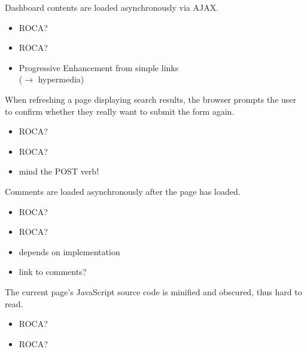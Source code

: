 \documentclass{beamer}
\newcommand{\rocaok}{\ding{51}}
\newcommand{\rocafail}{\ding{55}}
\begin{document}
\begin{frame}
  Dashboard contents are loaded asynchronously via AJAX.

  \vspace{0.3cm}
  \begin{itemize}
    \item<1|only@1>[\Large $\square$] \Large ROCA?
    \item<2|only@2>[\Large \rocaok] \Large ROCA?
    \item<2> Progressive Enhancement from simple links \\ (\ensuremath{\rightarrow} hypermedia)
  \end{itemize}

\end{frame}

\begin{frame}
  When refreshing a page displaying search results, the browser prompts the
  user to confirm whether they really want to submit the form again.

  \vspace{0.3cm}
  \begin{itemize}
    \item<1|only@1>[\Large $\square$] \Large ROCA?
    \item<2|only@2>[\Large \rocafail] \Large ROCA?
    \item<2> mind the POST verb!
  \end{itemize}

\end{frame}

\begin{frame}
  Comments are loaded asynchronously after the page has loaded.

  \vspace{0.3cm}
  \begin{itemize}
    \item<1|only@1>[\Large $\square$] \Large ROCA?
    \item<2|only@2>[\Large \rocaok] \Large ROCA?
    \item<2> depends on implementation
    \item<2> link to comments?
  \end{itemize}

\end{frame}

\begin{frame}
  The current page's JavaScript source code is minified and obscured, thus hard
  to read.

  \vspace{0.3cm}
  \begin{itemize}
    \item<1|only@1>[\Large $\square$] \Large ROCA?
    \item<2|only@2>[\Large \rocaok] \Large ROCA?
  \end{itemize}

\end{frame}
\end{document}
